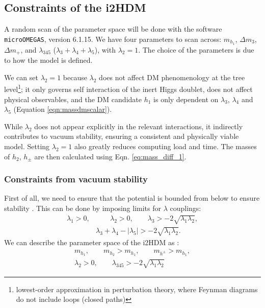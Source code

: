 \documentclass[12pt]{article}
\begin{document}
\subsection{Constraints of the i2HDM}
A random scan of the parameter space will be done with the software \verb|microOMEGAS|, version 6.1.15. We have four parameters to scan across: $m_{h_1}$, $\Delta m_3$, $\Delta m_+$, and $\lambda_{345}$ ($\lambda_3 + \lambda_4 + \lambda_5$), with $\lambda_2 = 1$. The choice of the parameters is due to how the model is defined.

We can set $\lambda_2 = 1$ because $\lambda_2$ does not affect DM phenomenology at the tree level\footnote{lowest-order approximation in perturbation theory, where Feynman diagrams do not include loops (closed paths)}\cite{Belyaev:2016lok}; it only governs self interaction of the inert Higgs doublet, does not affect physical observables, and the DM candidate $h_1$ is only dependent on $\lambda_3$, $\lambda_4$ and $\lambda_5$ (Equation \ref{eqn:massdmscalar}). 

While $\lambda_2$ does not appear explicitly in the relevant interactions, it indirectly contributes to vacuum stability, ensuring a consistent and physically viable model. Setting $\lambda_2 = 1$ also greatly reduces computing load and time. The masses of $h_2$, $h_\pm$ are then calculated using Eqn. \ref{eq:mass_diff_1}.

\subsubsection{Constraints from vacuum stability}
First of all, we need to ensure that the potential is bounded from below to ensure stability \cite{Deshpande:1977rw}. This can be done by imposing limits for $\lambda$ couplings:
\begin{equation}
    \begin{split}
    \lambda_1>0,& \qquad
    \lambda_2>0, \qquad
    \lambda_3> -2 \sqrt{ \lambda_1 \lambda_2}, \\
    &\lambda_3 + \lambda_4 - |\lambda_5| > -2 \sqrt{ \lambda_1 \lambda_2}.
    \end{split}
    \label{eq:potential_stability}
\end{equation}
We can describe the parameter space of the i2HDM as \cite{Belyaev:2016lok}:
\begin{equation}
    \begin{split}
        m_{h_1}, \qquad m_{h_2} > m_{h_1}, \qquad m_{h^\pm} > m_{h_1}, \\
        \lambda_2 > 0, \qquad \lambda_{345} > -2\sqrt{\lambda_1 \lambda_2}
    \end{split}
\end{equation}
\end{document}
